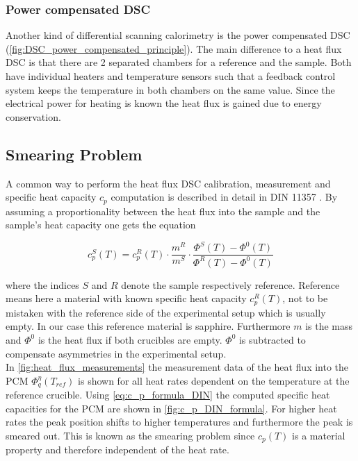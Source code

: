 \documentclass{scrartcl}[12pt, halfparskip]
\numberwithin{equation}{section}
\numberwithin{figure}{section}
\numberwithin{table}{section}
\begin{document}
\subsubsection{Power compensated DSC}
\label{sec:power_compensated_dsc}
Another kind of differential scanning calorimetry is the
power compensated DSC (\cref{fig:DSC_power_compensated_principle}). 
The main difference to a heat flux DSC is that there are 2 separated chambers for a reference and the sample. Both have individual heaters and temperature sensors such that a feedback control system keeps the temperature in both chambers on the same value. Since the electrical power for heating is known the heat flux is gained due to energy conservation. \\


\subsection{Smearing Problem}
\label{sec:smearing_problem}
A common way to perform the heat flux DSC calibration, measurement and specific heat capacity $c_p$ computation is described in detail in DIN 11357 \cite{DIN_11357}. By assuming a proportionality between the heat flux into the sample and the sample's heat capacity one gets the equation

\begin{equation}
	c_p^S(T) = c_p^{R}(T) \cdot \frac{m^R}{m^S} \cdot \frac{\varPhi^S(T) - \varPhi^0(T)}{\varPhi^R(T) - \varPhi^0(T)}
	\label{eq:c_p_formula_DIN}
\end{equation}

where the indices $S$ and $R$ denote the sample respectively reference. Reference means here a material with known specific heat capacity $c_p^R(T)$, not to be mistaken with the reference side of the experimental setup which is usually empty. In our case this reference material is sapphire. Furthermore $m$ is the mass and $\varPhi^0$ is the heat flux if both crucibles are empty. $\varPhi^0$ is subtracted to compensate asymmetries in the experimental setup. \\
In \cref{fig:heat_flux_measurements} the measurement data of the heat flux into the PCM $\varPhi_q^{\eta}(T_{ref})$ is shown for all heat rates dependent on the temperature at the reference crucible. Using \cref{eq:c_p_formula_DIN} the computed specific heat capacities for the PCM are shown in \cref{fig:c_p_DIN_formula}. For higher heat rates the peak position shifts to higher temperatures and furthermore the peak is smeared out. This is known as the smearing problem since $c_p(T)$ is a material property and therefore independent of the heat rate.
\end{document}

